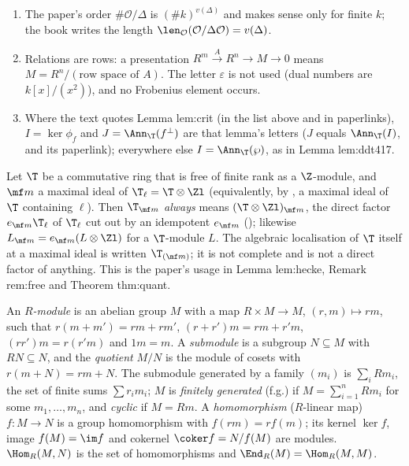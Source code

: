 \begin{convention}
\begin{enumerate}[label=(\alph*)]
${}^\perp S=\{x\in L:\langle x,S\rangle=0\}$ the \emph{left} orthogonal; for a symmetric or antisymmetric pairing on $L=M$ they agree and we
write $S^\perp$. An endomorphism $t$ of $L$ is \emph{self-adjoint} if $\langle tx,y\rangle=\langle x,ty\rangle$ for all $x,y$.
\item The paper's order $\#\mathcal O/\Delta$ is $(\#k)^{v(\Delta)}$ and makes sense only for finite $k$; the book writes the length
$\len_{\mathcal O}(\mathcal O/\Delta\mathcal O)=v(\Delta)$.
\item Relations are rows: a presentation $R^m\xrightarrow{A}R^n\to M\to0$ means $M=R^n/(\text{row space of }A)$. The letter $\varepsilon$
is not used (dual numbers are $k[x]/(x^2)$), and no Frobenius element occurs.
\item Where the text quotes Lemma lem:crit (in the list above and in paperlinks), $I=\ker\phi_f$ and $J=\Ann_\T(f^\perp)$ are that lemma's
letters ($J$ equals $\Ann_\T(I)$,  and its paperlink); everywhere else $I=\Ann_\T(\wp)$, as in Lemma lem:ddt417.
\end{enumerate}
\end{convention}

\begin{convention}\label{conv:modules:tm}
Let $\T$ be a commutative ring that is free of finite rank as a $\Z$-module, and $\mf m$ a maximal ideal of
$\T_\ell=\T\otimes\Zl$ (equivalently, by , a maximal ideal of $\T$ containing $\ell$). Then
$\T_{\mf m}$ \emph{always} means $(\T\otimes\Zl)_{\mf m}$, the direct factor $e_{\mf m}\T_\ell$ of $\T_\ell$ cut out by an idempotent
$e_{\mf m}$ (); likewise $L_{\mf m}=e_{\mf m}(L\otimes\Zl)$ for a $\T$-module $L$. The algebraic
localisation of $\T$ itself at a maximal ideal is written $\T_{(\mf m)}$; it is not complete and is not a direct factor of
anything. This is the paper's usage in Lemma lem:hecke, Remark rem:free and Theorem thm:quant.
\end{convention}

\begin{definition}[modules]\label{def:modules:module}
An \emph{$R$-module} is an abelian group $M$ with a map $R\times M\to M$, $(r,m)\mapsto rm$, such that
$r(m+m')=rm+rm'$, $(r+r')m=rm+r'm$, $(rr')m=r(r'm)$ and $1m=m$. A \emph{submodule} is a subgroup $N\subseteq M$ with
$RN\subseteq N$, and the \emph{quotient} $M/N$ is the module of cosets with $r(m+N)=rm+N$. The submodule generated by a
family $(m_i)$ is $\sum_iRm_i$, the set of finite sums $\sum r_im_i$; $M$ is \emph{finitely generated} (f.g.) if
$M=\sum_{i=1}^nRm_i$ for some $m_1,\dots,m_n$, and \emph{cyclic} if $M=Rm$. A \emph{homomorphism} ($R$-linear map)
$f\colon M\to N$ is a group homomorphism with $f(rm)=rf(m)$; its kernel $\ker f$, image $f(M)=\im f$ and cokernel
$\coker f=N/f(M)$ are modules. $\Hom_R(M,N)$ is the set of homomorphisms and $\End_R(M)=\Hom_R(M,M)$.
\end{definition}

